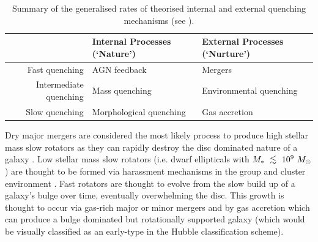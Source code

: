 \documentclass[useAMS,usenatbib]{mn2e}
\def\lesssim{\mathrel{\hbox{\rlap{\hbox{\lower3pt\hbox{$\sim$}}}\hbox{\raise2pt\hbox{$<$}}}}}
\begin{document}
\begin{table}
\centering
\caption{Summary of the generalised rates of theorised internal and external quenching mechanisms (see \protect\citealt{smethurst17}).}
\label{table:qm}
%
\begin{tabularx}{\textwidth}{r|C|C}
\hline
{}  & Internal Processes (`Nature')      & External Processes (`Nurture')     \\ \hline
Fast quenching         & AGN feedback            & Mergers           \\
Intermediate quenching & Mass quenching          & Environmental quenching \\
Slow quenching         & Morphological quenching & Gas accretion           \\ \hline
\end{tabularx}
\end{table}

Dry major mergers are considered the most likely process to produce high stellar mass slow rotators \citep{bois10, duc11, naab14} as they can rapidly destroy the disc dominated nature of a galaxy \citep{toomre72}. Low stellar mass slow rotators (i.e. dwarf ellipticals with $M_*~\lesssim~10^9~M_{\odot}$) are thought to be formed via harassment mechanisms in the group and cluster environment \citep{toloba15}. %
Fast rotators are thought to evolve from the slow build up of a galaxy's bulge over time, eventually overwhelming the disc. This growth is thought to occur via gas-rich major or minor mergers \citep{duc11} and by gas accretion \citep{cappellari13, johnston14} which can produce a bulge dominated but rotationally supported galaxy (which would be visually classified as an early-type in the Hubble classification scheme). %
\end{document}
